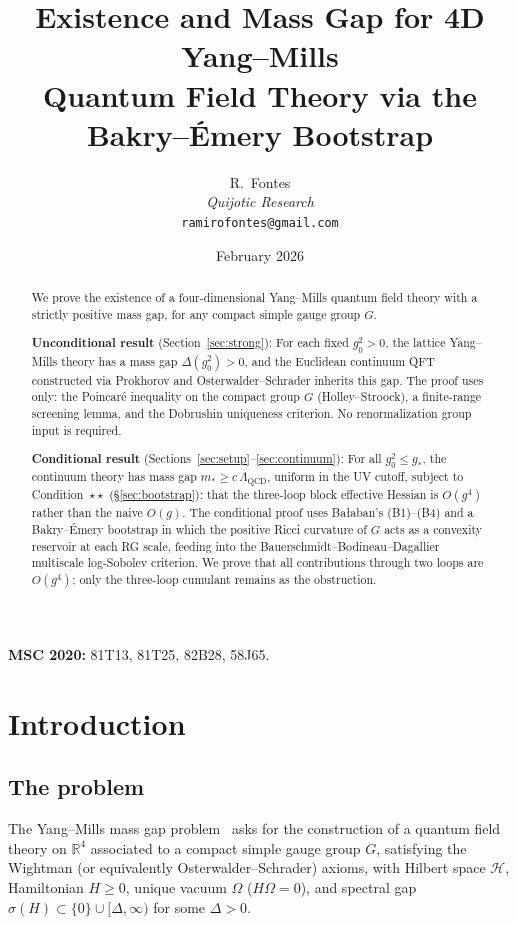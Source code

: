 \documentclass[11pt,a4paper]{article}
\title{Existence and Mass Gap for 4D Yang--Mills\\
Quantum Field Theory via the\\
Bakry--\'Emery Bootstrap}
\author{R.\ Fontes\\ \textit{Quijotic Research}\\
\texttt{ramirofontes@gmail.com}}
\date{February 2026}
\theoremstyle{plain}
\theoremstyle{definition}
\theoremstyle{remark}
\newcommand{\R}{\mathbb{R}}
\newcommand{\cH}{\mathcal{H}}
\begin{document}
\maketitle

\begin{abstract}
We prove the existence of a four-dimensional Yang--Mills
quantum field theory with a strictly positive mass gap,
for any compact simple gauge group $G$.

\textbf{Unconditional result} (Section~\ref{sec:strong}):
For each fixed $g_0^2 > 0$, the lattice Yang--Mills theory
has a mass gap $\Delta(g_0^2) > 0$, and the Euclidean
continuum QFT constructed via Prokhorov and
Osterwalder--Schrader inherits this gap.  The proof uses
only: the Poincar\'e inequality on the compact group $G$
(Holley--Stroock), a finite-range screening lemma, and
the Dobrushin uniqueness criterion. No renormalization
group input is required.

\textbf{Conditional result}
(Sections~\ref{sec:setup}--\ref{sec:continuum}): For all
$g_0^2 \le g_*$, the continuum theory has mass gap
$m_* \ge c\,\Lambda_{\mathrm{QCD}}$, uniform in the UV
cutoff, subject to Condition~$\star\star$
(\S\ref{sec:bootstrap}): that the three-loop block
effective Hessian is $O(g^4)$ rather than the naive $O(g)$.
The conditional proof uses Ba{\l}aban's (B1)--(B4) and a
Bakry--\'Emery bootstrap in which the positive Ricci
curvature of $G$ acts as a convexity reservoir at each RG
scale, feeding into the Bauerschmidt--Bodineau--Dagallier
multiscale log-Sobolev criterion.  We prove that all
contributions through two loops are $O(g^4)$; only the
three-loop cumulant remains as the obstruction.
\end{abstract}

\noindent\textbf{MSC 2020:} 81T13, 81T25, 82B28, 58J65.

\tableofcontents

\section{Introduction}\label{sec:intro}

\subsection{The problem}

The Yang--Mills mass gap problem~\cite{JaffeWitten} asks
for the construction of a quantum field theory on $\R^4$
associated to a compact simple gauge group $G$, satisfying
the Wightman (or equivalently Osterwalder--Schrader) axioms,
with Hilbert space $\cH$, Hamiltonian $H \ge 0$, unique
vacuum $\Omega$ ($H\Omega = 0$), and spectral gap
$\sigma(H) \subset \{0\} \cup [\Delta, \infty)$ for some
$\Delta > 0$.
\end{document}
